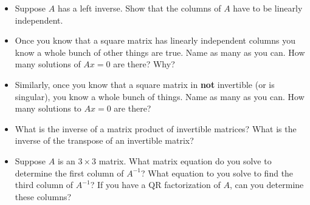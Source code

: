 \documentclass[11pt,fleqn]{article}
\begin{document}
	\begin{itemize}
	\item Suppose $A$ has a left inverse.  Show that the columns of $A$ have to be linearly independent.
	\item Once you know that a square matrix has linearly independent columns you know a whole bunch 
of other things are true.  Name as many as you can.  How many solutions of $Ax=0$ are there?  Why?
	\item Similarly, once you know that a square matrix in \textbf{not} invertible (or is singular), you know a whole bunch of things. Name as many as you can. How many solutions to $Ax=0$ are there?
	\item What is the inverse of a matrix product of invertible matrices? What is the inverse of the transpose of an invertible matrix?	
	\item Suppose $A$ is an $3\times 3$ matrix.  What matrix equation do you solve to determine
the first column of $A^{-1}$? What equation to you solve to find the third column of $A^{-1}$?
If you have a QR factorization of $A$, can you determine these columns?
	\end{itemize}
\end{document}

